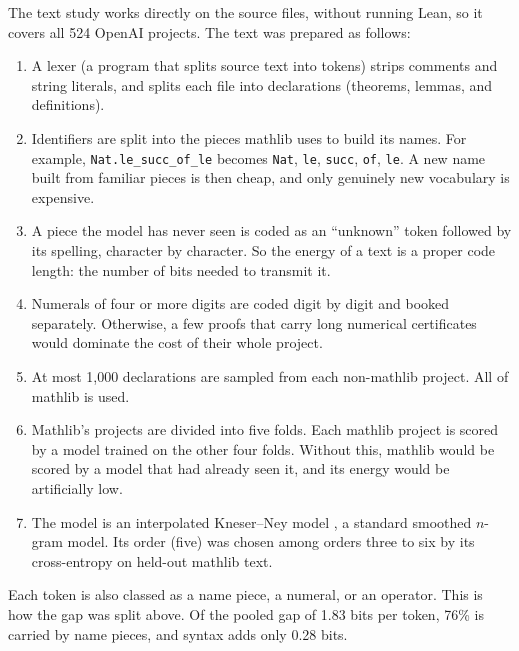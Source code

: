 \documentclass{article}
\begin{document}
The text study works directly on the source files, without running Lean, so it covers all 524 OpenAI projects. The text was prepared as follows:
\begin{enumerate}
    \item
    A lexer (a program that splits source text into tokens) strips comments and string literals, and splits each file into declarations (theorems, lemmas, and
    definitions).
    \item
    Identifiers are split into the pieces mathlib uses to build its names. For example, \texttt{Nat.le\_succ\_of\_le}
    becomes \texttt{Nat}, \texttt{le}, \texttt{succ}, \texttt{of}, \texttt{le}. A new name built from familiar pieces
    is then cheap, and only genuinely new vocabulary is expensive.
    \item
    A piece the model has never seen is coded as an ``unknown'' token followed by its spelling, character by
    character. So the energy of a text is a proper code length: the number of bits needed to transmit it.
    \item
    Numerals of four or more digits are coded digit by digit and booked separately. Otherwise, a few proofs that carry
    long numerical certificates would dominate the cost of their whole project.
    \item
    At most 1,000 declarations are sampled from each non-mathlib project. All of mathlib is used.
    \item
    Mathlib's projects are divided into five folds. Each mathlib project is scored by a model trained on the other four
    folds. Without this, mathlib would be scored by a model that had already seen it, and its energy would be
    artificially low.
    \item
    The model is an interpolated Kneser--Ney model \textit{\parencite{kneser1995,chen1999smoothing}}, a standard smoothed $n$-gram model. Its order (five) was chosen
    among orders three to six by its cross-entropy on held-out mathlib text.
\end{enumerate}
Each token is also classed as a name piece, a numeral, or an operator. This is how the gap was split above. Of the
pooled gap of 1.83 bits per token, 76\% is carried by name pieces, and syntax adds only 0.28 bits.
\end{document}
